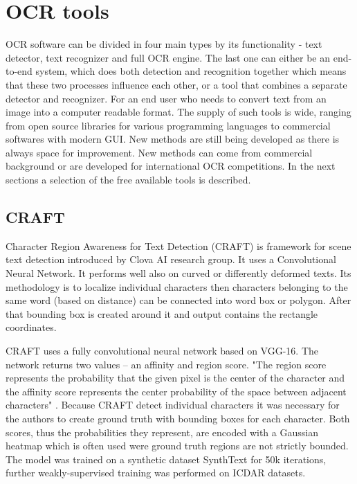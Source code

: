 \chapter{OCR tools}
\label{ch:sw}
OCR software can be divided in four main types by its functionality - text detector, text recognizer and full OCR engine. The last one can either be an end-to-end system, which does both detection and recognition together which means that these two processes influence each other, or a tool that combines a separate detector and recognizer. For an end user who needs to convert text from an image into a computer readable format. The supply of such tools is wide, ranging from open source libraries for various programming languages to commercial softwares with modern GUI. New methods are still being developed as there is always space for improvement. New methods can come from commercial background or are developed for international OCR competitions. In the next sections a selection of the free available tools is described.

\section{CRAFT}

Character Region Awareness for Text Detection (CRAFT) is framework for scene text detection introduced by Clova AI research group. It uses a Convolutional Neural Network. It performs well also on curved or differently deformed texts. Its methodology is to localize individual characters then characters belonging to the same word (based on distance) can be connected into word box or polygon. After that bounding box is created around it and output contains the rectangle coordinates.\cite{craft2}

CRAFT uses  a fully convolutional neural network based on VGG-16.%
The network returns two values -- an affinity and region score. "The region score represents the probability that the given pixel is the center of the character and the affinity score represents the center probability of the space between adjacent characters" \cite[page 3]{craft2}. Because CRAFT detect individual characters it was necessary for the authors to create ground truth with bounding boxes for each character. Both scores, thus the probabilities they represent, are encoded with a Gaussian heatmap which is often used were ground truth regions are not strictly bounded. The model was trained on a synthetic dataset SynthText for 50k iterations, further weakly-supervised training was performed on ICDAR datasets.\cite{craft2}

